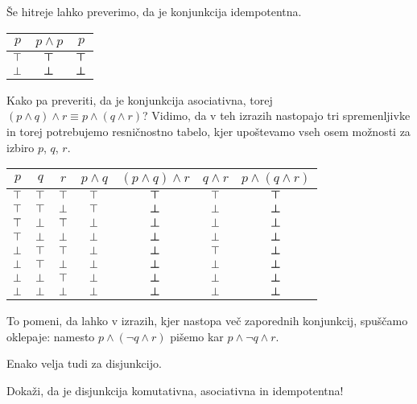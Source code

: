 		Še hitreje lahko preverimo, da je konjunkcija idempotentna.
		
		\begin{center}
			\begin{tabular}{c|cc}
				$p$ & $p \land p$ & $p$ \\
				\hline
				$\top$ & $\bm{\top}$ & $\bm{\top}$ \\
				$\bot$ & $\bm{\bot}$ & $\bm{\bot}$
			\end{tabular}
		\end{center}
		
		Kako pa preveriti, da je konjunkcija asociativna, torej $(p \land q) \land r \equiv p \land (q \land r)$? Vidimo, da v teh izrazih nastopajo tri spremenljivke in torej potrebujemo resničnostno tabelo, kjer upoštevamo vseh osem možnosti za izbiro $p$, $q$, $r$.
		
		\begin{center}
			\begin{tabular}{ccc|cccc}
				$p$ & $q$ & $r$ & $p \land q$ & $(p \land q) \land r$ & $q \land r$ & $p \land (q \land r)$ \\
				\hline
				$\top$ & $\top$ & $\top$ & $\top$ & $\bm{\top}$ & $\top$ & $\bm{\top}$ \\
				$\top$ & $\top$ & $\bot$ & $\top$ & $\bm{\bot}$ & $\bot$ & $\bm{\bot}$ \\
				$\top$ & $\bot$ & $\top$ & $\bot$ & $\bm{\bot}$ & $\bot$ & $\bm{\bot}$ \\
				$\top$ & $\bot$ & $\bot$ & $\bot$ & $\bm{\bot}$ & $\bot$ & $\bm{\bot}$ \\
				$\bot$ & $\top$ & $\top$ & $\bot$ & $\bm{\bot}$ & $\top$ & $\bm{\bot}$ \\
				$\bot$ & $\top$ & $\bot$ & $\bot$ & $\bm{\bot}$ & $\bot$ & $\bm{\bot}$ \\
				$\bot$ & $\bot$ & $\top$ & $\bot$ & $\bm{\bot}$ & $\bot$ & $\bm{\bot}$ \\
				$\bot$ & $\bot$ & $\bot$ & $\bot$ & $\bm{\bot}$ & $\bot$ & $\bm{\bot}$
			\end{tabular}
		\end{center}
		
		To pomeni, da lahko v izrazih, kjer nastopa več zaporednih konjunkcij, spuščamo oklepaje: namesto $p \land (\lnot{q} \land r)$ pišemo kar $p \land \lnot{q} \land r$.
		
		Enako velja tudi za disjunkcijo.
		
		\begin{vaja}
			Dokaži, da je disjunkcija komutativna, asociativna in idempotentna!
		\end{vaja}
		
